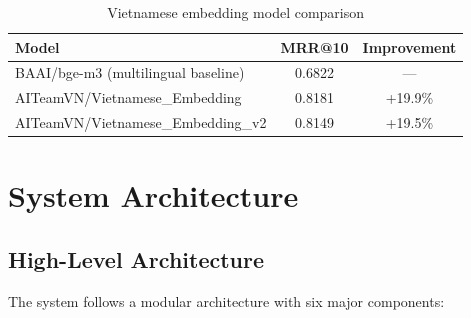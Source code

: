 \documentclass[12pt,a4paper]{article}
\begin{document}
\begin{table}[H]
\centering
\caption{Vietnamese embedding model comparison}
\label{tab:embeddings}
\begin{tabular}{lcc}
\toprule
\textbf{Model} & \textbf{MRR@10} & \textbf{Improvement} \\
\midrule
BAAI/bge-m3 (multilingual baseline) & 0.6822 & --- \\
AITeamVN/Vietnamese\_Embedding & 0.8181 & +19.9\% \\
AITeamVN/Vietnamese\_Embedding\_v2 & 0.8149 & +19.5\% \\
\bottomrule
\end{tabular}
\end{table}

\section{System Architecture}
\label{sec:architecture}

\subsection{High-Level Architecture}

The system follows a modular architecture with six major components:
\end{document}
